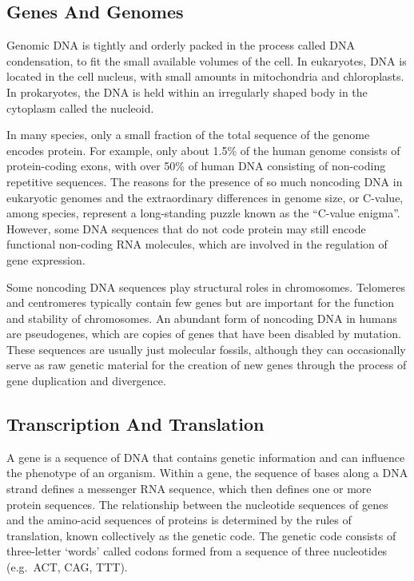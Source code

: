 \hypertarget{genes-and-genomes}{%
\subsection{Genes And Genomes}\label{genes-and-genomes}}

Genomic DNA is tightly and orderly packed in the process called DNA condensation, to fit the small available volumes of the cell. In eukaryotes, DNA is located in the cell nucleus, with small amounts in mitochondria and chloroplasts. In prokaryotes, the DNA is held within an irregularly shaped body in the cytoplasm called the nucleoid.

In many species, only a small fraction of the total sequence of the genome encodes protein. For example, only about 1.5\% of the human genome consists of protein-coding exons, with over 50\% of human DNA consisting of non-coding repetitive sequences. The reasons for the presence of so much noncoding DNA in eukaryotic genomes and the extraordinary differences in genome size, or C-value, among species, represent a long-standing puzzle known as the ``C-value enigma''. However, some DNA sequences that do not code protein may still encode functional non-coding RNA molecules, which are involved in the regulation of gene expression.

Some noncoding DNA sequences play structural roles in chromosomes. Telomeres and centromeres typically contain few genes but are important for the function and stability of chromosomes. An abundant form of noncoding DNA in humans are pseudogenes, which are copies of genes that have been disabled by mutation. These sequences are usually just molecular fossils, although they can occasionally serve as raw genetic material for the creation of new genes through the process of gene duplication and divergence.

\hypertarget{transcription-and-translation}{%
\subsection{Transcription And Translation}\label{transcription-and-translation}}

A gene is a sequence of DNA that contains genetic information and can influence the phenotype of an organism. Within a gene, the sequence of bases along a DNA strand defines a messenger RNA sequence, which then defines one or more protein sequences. The relationship between the nucleotide sequences of genes and the amino-acid sequences of proteins is determined by the rules of translation, known collectively as the genetic code. The genetic code consists of three-letter `words' called codons formed from a sequence of three nucleotides (e.g.~ACT, CAG, TTT).

